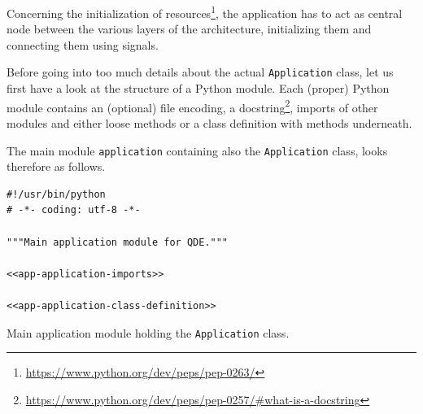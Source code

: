 \documentclass[10pt, openright, notitlepage]{scrreprt}
\begin{document}
Concerning the initialization of
resources\footnote{\url{https://www.python.org/dev/peps/pep-0263/}}, the application has
to act as central node between the various layers of the architecture,
initializing them and connecting them using signals.\cite[S. 37 bis 38]{osterwalder_qde_2016}

Before going into too much details about the actual \texttt{Application} class, let us
first have a look at the structure of a Python module. Each (proper) Python
module contains an (optional) file encoding, a
docstring\footnote{\url{https://www.python.org/dev/peps/pep-0257/\#what-is-a-docstring}},
imports of other modules and either loose methods or a class definition with
methods underneath.

The main module \texttt{application} containing also the \texttt{Application} class, looks
therefore as follows.

\begin{listing}[H]
\begin{verbatim}
#!/usr/bin/python
# -*- coding: utf-8 -*-

"""Main application module for QDE."""

<<app-application-imports>>

<<app-application-class-definition>>
\end{verbatim}
\caption{Main application module holding the \texttt{Application} class.}
\end{listing}
\end{document}
